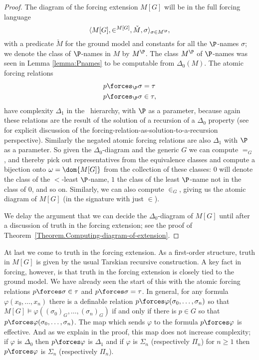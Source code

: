 \documentclass{amsart}
\begin{document}
\begin{proof}
The diagram of the forcing extension $M[G]$ will be in the full forcing language
 $$\langle M[G],\in^{M[G]},\check M,\sigma\rangle_{\sigma\in M^\P},$$
with a predicate $\check M$ for the ground model and constants for all the $\P$-names $\sigma$; we denote the class of $\P$-names in $M$ by $M^\P$. The class $M^\P$ of $\P$-names was seen in Lemma \ref{lemma:Pnames}
to be computable from $\Delta_0(M)$.
The atomic forcing relations
\begin{align*}
p &\forces_\P \sigma = \tau \\
p &\forces_\P \sigma \in \tau,
\end{align*}
have complexity $\Delta_1$ in the \Levy\ hierarchy, with $\P$ as a parameter, because again these relations are the result of the solution of a recursion of a $\Delta_0$ property (see \cite{GHHSW:to-appear} for explicit discussion of the forcing-relation-as-solution-to-a-recursion perspective). Similarly the negated atomic forcing relations are also $\Delta_1$ with $\P$ as a parameter.
So given the $\Delta_0$-diagram and the generic $G$ we can compute $=_G$, and thereby pick out representatives from the equivalence classes and compute a bijection onto $\omega=\dom{M[G]}$ from the collection of these classes: $0$ will
denote the class of the $<$-least $\P$-name, $1$ the class of the least $\P$-name not in the class of $0$, and so on. Similarly, we can also compute $\in_G$, giving us the atomic diagram of $M[G]$ (in the signature with just $\in$).

We delay the argument that we can decide the $\Delta_0$-diagram of $M[G]$ until after a discussion of truth in the forcing extension; see the proof of Theorem~\ref{Theorem.Computing-diagram-of-extension}.
\end{proof}

At last we come to truth in the forcing extension. As a first-order structure, truth in $M[G]$ is given by the usual Tarskian recursive construction. A key fact in forcing, however, is that truth in the forcing extension is closely tied to the ground model. We have already seen the start of this with the atomic forcing relations $p \forces \sigma \in \tau$ and $p \forces \sigma = \tau$. In general, for any formula $\varphi(x_0,\ldots,x_n)$ there is a definable relation $p \forces \varphi(\sigma_0,\ldots,\sigma_n)$ so that $M[G] \models \varphi((\sigma_0)_G,\ldots,(\sigma_n)_G)$ if and only if there is $p \in G$ so that $p \forces \varphi(\sigma_0,\ldots,\sigma_n)$. The map which sends $\varphi$ to the formula $p \forces \varphi$ is effective. And as we explain in the proof, this map does not increase complexity; if $\varphi$ is $\Delta_0$ then $p \forces \varphi$ is $\Delta_1$ and if $\varphi$ is $\Sigma_n$ (respectively $\Pi_n$) for $n \ge 1$ then $p \forces \varphi$ is $\Sigma_n$ (respectively $\Pi_n$).
\end{document}
